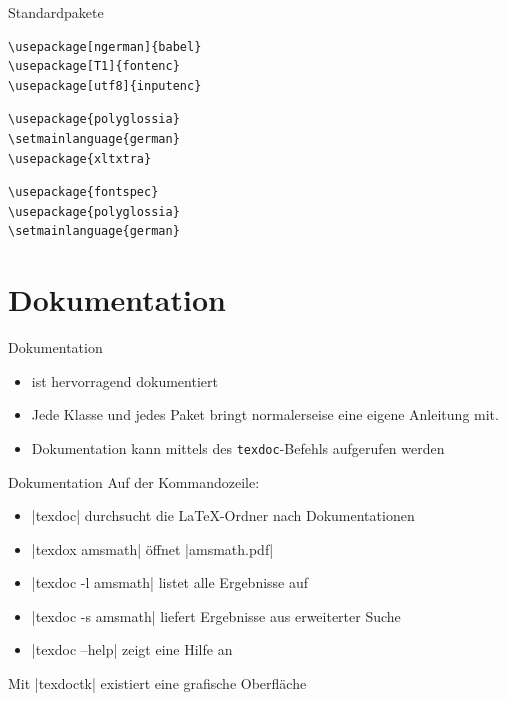 \documentclass[
	vorläufig=true,
	datum=2016-10-28,
	titel={Allgemeine Formatierung und Pakete},
	web=false,
]{../tex/latexkurs-slides}
\begin{document}
\begin{frame}[fragile]{Standardpakete}
\begin{lstlisting}
\usepackage[ngerman]{babel}
\usepackage[T1]{fontenc}
\usepackage[utf8]{inputenc}
\end{lstlisting}
\vfill
\XeLaTeX {}
\begin{lstlisting}
\usepackage{polyglossia}
\setmainlanguage{german}
\usepackage{xltxtra}
\end{lstlisting}
\vfill
{}
\begin{lstlisting}
\usepackage{fontspec}
\usepackage{polyglossia}
\setmainlanguage{german}
\end{lstlisting}
\end{frame}

\section{Dokumentation}
\begin{frame}{Dokumentation}
	\begin{itemize}
		\item {} ist hervorragend dokumentiert
		\item Jede Klasse und jedes Paket bringt normalerseise eine eigene Anleitung mit.
		\item Dokumentation kann mittels des \texttt{texdoc}-Befehls aufgerufen werden
	\end{itemize}
\end{frame}

\begin{frame}[fragile]{Dokumentation}
	Auf der Kommandozeile:
	\begin{itemize}
		\item |texdoc| durchsucht die \LaTeX-Ordner nach Dokumentationen
		\item |texdox amsmath| öffnet |amsmath.pdf|
		\item |texdoc -l amsmath| listet alle Ergebnisse auf
		\item |texdoc -s amsmath| liefert Ergebnisse aus erweiterter Suche
		\item |texdoc --help| zeigt eine Hilfe an
	\end{itemize}
	Mit |texdoctk| existiert eine grafische Oberfläche
\end{frame}
\end{document}
